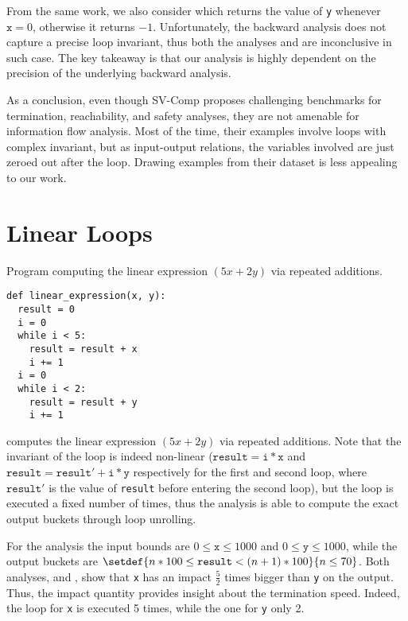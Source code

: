 From the same work, we also consider  which returns the value of \texttt{y} whenever $\texttt{x} = 0$, otherwise it returns $-1$.
Unfortunately, the backward analysis does not capture a precise loop invariant, thus both the analyses \abstractoutcomesname{} and \abstractrangename are inconclusive in such case.
The key takeaway is that our analysis is highly dependent on the precision of the underlying backward analysis.

As a conclusion, even though SV-Comp proposes challenging benchmarks for termination, reachability, and safety analyses, they are not amenable for information flow analysis.
Most of the time, their examples involve loops with complex invariant, but as input-output relations, the variables involved are just zeroed out after the loop.
Drawing examples from their dataset is less appealing to our work.

\section{Linear Loops}


\begin{marginlisting}
  \caption{Program computing the linear expression $(5x + 2y)$ via repeated additions.}
  \vspace{0.9cm}
\begin{lstlisting}[style=mystyle,
  language=customPython,
  escapechar=\%,
]
def linear_expression(x, y):
  result = 0
  i = 0
  while i < 5:
    result = result + x
    i += 1
  i = 0
  while i < 2:
    result = result + y
    i += 1
\end{lstlisting}
\end{marginlisting}

 computes the linear expression $(5x + 2y)$ via repeated additions.
Note that the invariant of the loop is indeed non-linear ($\texttt{result} = \texttt{i} * \texttt{x}$ and $\texttt{result} = \texttt{result}' + \texttt{i} * \texttt{y}$ respectively for the first and second loop, where $\texttt{result}'$ is the value of \texttt{result} before entering the second loop), but the loop is executed a fixed number of times, thus the analysis is able to compute the exact output buckets through loop unrolling.

For the analysis the input bounds are $0 \le \texttt{x} \le 1000$ and $0 \le \texttt{y} \le 1000$, while the output buckets are $\setdef{n * 100 \le \texttt{result} < (n + 1) * 100}{n \le 70}$.
Both analyses, \abstractoutcomesname{} and \abstractrangename, show that \texttt{x} has an impact $\frac{5}{2}$ times bigger than \texttt{y} on the output.
Thus, the impact quantity provides insight about the termination speed.
Indeed, the loop for \texttt{x} is executed 5 times, while the one for \texttt{y} only 2.


